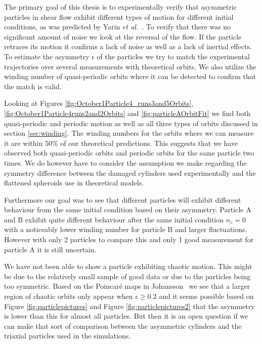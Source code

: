 The primary goal of this thesis is to experimentally verify that asymmetric particles in shear flow exhibit different types of motion for different initial conditions, as was predicted by Yarin \emph{et al.}~\cite{Yarin}. To verify that there was no significant amount of noise we look at the reversal of the flow. If the particle retraces its motion it confirms a lack of noise as well as a lack of inertial effects. To estimate the asymmetry $\epsilon$ of the particles we try to match the experimental trajectories over several measurements with theoretical orbits. We also utilize the winding number of quasi-periodic orbits where it can be detected to confirm that the match is valid.

Looking at Figures \ref{fig:October1Particle4_runs3and5Orbits}, \ref{fig:October1Particle4runs2and2Orbits} and \ref{fig:particleAOrbitFit} we find both quasi-periodic and periodic motion as well as all three types of orbits discussed in section \ref{sec:winding}. The winding numbers for the orbits where we can measure it are within $50\%$ of our theoretical predictions. This suggests that we have observed both quasi-periodic orbits and periodic orbits for the same particle two times. We do however have to consider the assumption we make regarding the symmetry difference between the damaged cylinders used experimentally and the flattened spheroids use in theoretical models.

Furthermore our goal was to see that different particles will exhibit different behaviour from the same initial condition based on their asymmetry. Particle A and B exhibit quite different behaviour after the same initial condition $n_z = 0$ with a noticeably lower winding number for particle B and larger fluctuations. However with only 2 particles to compare this and only 1 good measurement for particle A it is still uncertain. 

We have not been able to show a particle exhibiting chaotic motion. This might be due to the relatively small sample of good data or due to the particles being too symmetric. Based on the Poincaré maps in Johansson~\cite{AntonThesis} we see that a larger region of chaotic orbits only appear when $\epsilon \geq 0.2$ and it seems possible based on Figure \ref{fig:particlepictures} and Figure \ref{fig:particlepictures2} that the asymmetry is lower than this for almost all particles. But then it is an open question if we can make that sort of comparison between the asymmetric cylinders and the triaxial particles used in the simulations. 

